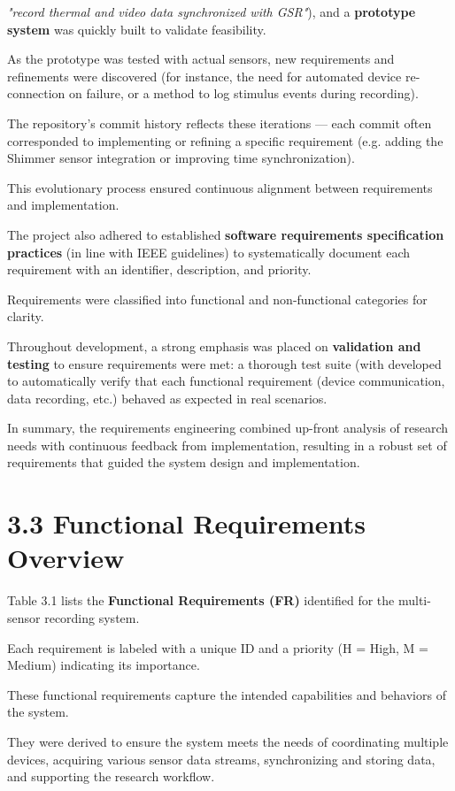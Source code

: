 \textit{"record thermal and video data synchronized with GSR"}), and a \textbf{prototype system}
 was quickly built to validate feasibility.

As the prototype was tested with actual sensors, new requirements and
refinements were discovered (for instance, the need for automated device
re-connection on failure, or a method to log stimulus events during recording).

The repository's commit history reflects these iterations --- each commit often
corresponded to implementing or refining a specific requirement (e.g. adding the
Shimmer sensor integration or improving time synchronization).

This evolutionary process ensured continuous alignment between requirements and
implementation.

The project also adhered to established \textbf{software requirements specification practices}
(in line with IEEE guidelines) to systematically document each requirement with
an identifier, description, and priority.

Requirements were classified into functional and non-functional categories for
clarity.

Throughout development, a strong emphasis was placed on \textbf{validation and testing}
to ensure requirements were met: a thorough test suite (with %
developed to automatically verify that each functional requirement (device
communication, data recording, etc.) behaved as expected in real scenarios.

In summary, the requirements engineering combined up-front analysis of research
needs with continuous feedback from implementation, resulting in a robust set of
requirements that guided the system design and implementation.

\section{3.3 Functional Requirements Overview}

Table 3.1 lists the \textbf{Functional Requirements (FR)}
 identified for the multi-sensor recording system.

Each requirement is labeled with a unique ID and a priority (H = High, M =
Medium) indicating its importance.

These functional requirements capture the intended capabilities and behaviors of
the system.

They were derived to ensure the system meets the needs of coordinating multiple
devices, acquiring various sensor data streams, synchronizing and storing data,
and supporting the research workflow.


